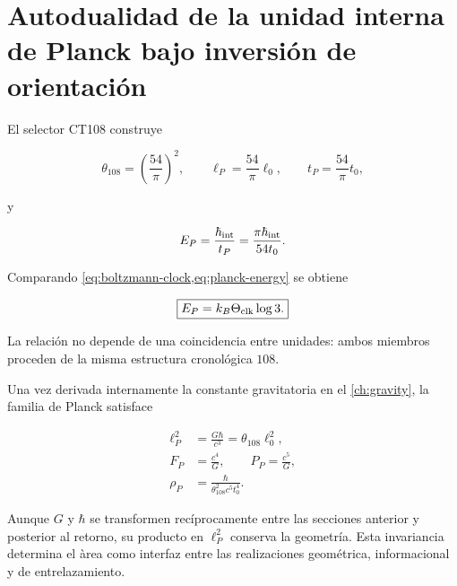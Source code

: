 \section{Autodualidad de la unidad interna de Planck bajo inversión de orientación}

El selector CT108 construye

\begin{equation}
\theta_{108}=\left(\frac{54}{\pi}\right)^2,
\qquad
\ell_P=\frac{54}{\pi}\ell_0,
\qquad
t_P=\frac{54}{\pi}t_0,
\label{eq:planck-length-time}
\end{equation}

y

\begin{equation}
E_P=\frac{\hbar_{\rm int}}{t_P}
=\frac{\pi\hbar_{\rm int}}{54t_0}.
\label{eq:planck-energy}
\end{equation}

Comparando \cref{eq:boltzmann-clock,eq:planck-energy} se obtiene

\begin{equation}
\boxed{E_P=k_B\Theta_{\rm clk}\log3.}
\label{eq:planck-trit}
\end{equation}

La relaci\'on no depende de una coincidencia entre unidades: ambos miembros
proceden de la misma estructura cronol\'ogica \(108\).

Una vez derivada internamente la constante gravitatoria en el
\cref{ch:gravity}, la familia de Planck satisface

\begin{align}
\ell_P^2&=\frac{G\hbar}{c^3}=\theta_{108}\ell_0^2,
\label{eq:planck-area}\\
F_P&=\frac{c^4}{G},
\qquad
P_P=\frac{c^5}{G},
\label{eq:planck-force-power}\\
\rho_P&=\frac{\hbar}{\theta_{108}^2c^5t_0^4}.
\label{eq:planck-density}
\end{align}

Aunque \(G\) y \(\hbar\) se transformen rec\'iprocamente entre las secciones
anterior y posterior al retorno, su producto en \(\ell_P^2\) conserva la
geometr\'ia. Esta invariancia determina el \`area como interfaz entre las
realizaciones geom\'etrica, informacional y de entrelazamiento.
